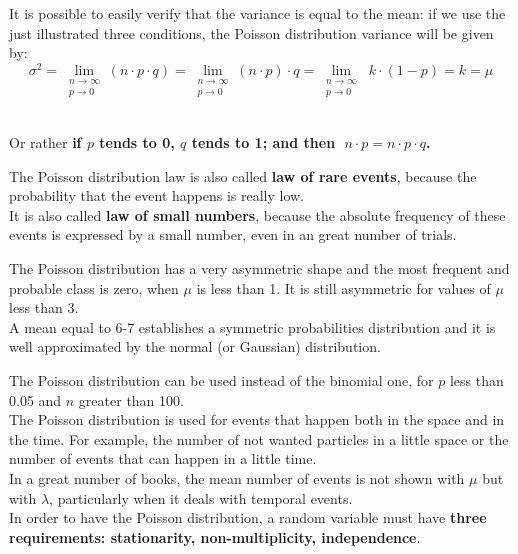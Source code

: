 \begin{frame}
  \vspace*{.25cm}
  It is possible to easily verify that the variance is equal to the mean: if we use the just illustrated three conditions, the Poisson distribution variance will be given by:
  \vspace*{.25cm}
  $$ \sigma^2 = \lim_{\substack{n \rightarrow \infty \\ p \rightarrow 0}}{(n \cdot p \cdot q)} = \lim_{\substack{n \rightarrow \infty \\ p \rightarrow 0}}{(n \cdot p) \cdot q} = \lim_{\substack{n \rightarrow \infty \\ p \rightarrow 0}}{\; k \cdot (1- p)} = k = \mu $$\\
  \begin{center}
    Or rather \textbf{if {\boldmath $ p $} tends to 0, {\boldmath $ q $} tends to 1; and then {\boldmath $ \;n \cdot p = n \cdot p \cdot q $}.}
  \end{center}
  \vspace*{.35cm}
  The Poisson distribution law is also called \textbf{law of rare events}, because the probability that the event happens is really low.\\
  \vspace*{.25cm}
  It is also called \textbf{law of small numbers}, because the absolute frequency of these events is expressed by a small number, even in an great number of trials.
\end{frame}

\begin{frame}
  \vspace*{.5cm}
  The Poisson distribution has a very asymmetric shape and the most frequent and probable class is zero, when $ \mu $ is less than 1. It is still asymmetric for values of $ \mu $ less than 3.\\
  \vspace*{.5cm}
  A mean equal to 6-7 establishes a symmetric probabilities distribution and it is well approximated by the normal (or Gaussian) distribution.
\end{frame}

\begin{frame}
  \vspace*{.25cm}
  The Poisson distribution can be used instead of the binomial one, for $ p $ less than 0.05 and $ n $ greater than 100.\\
  \vspace*{.5cm}
  The Poisson distribution is used for events that happen both in the space and in the time. For example, the number of not wanted particles in a little space or the number of events that can happen in a little time.\\
  \vspace*{.5cm}
  In a great number of books, the mean number of events is not shown with $ \mu $ but with {\boldmath $ \lambda $}, particularly when it deals with temporal events.\\
  \vspace*{.5cm}
  In order to have the Poisson distribution, a random variable must have \textbf{three requirements: stationarity, non-multiplicity, independence}.
\end{frame}

